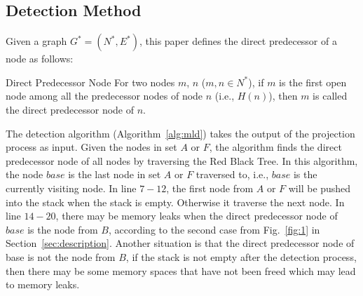 \subsection{Detection Method}

Given a graph $G^*=(N^*, E^*)$, this paper defines the direct predecessor of a node as follows:

\begin{definition}{Direct Predecessor Node}
For two nodes $m$, $n$ ($m, n\in N^*$), if $m$ is the first open node among all the predecessor nodes of node $n$ (i.e., $Η(n)$), then $m$ is called the direct predecessor node of $n$.
\end{definition}

The detection algorithm (Algorithm~\ref{alg:mld}) takes the output of the projection process as input. %
Given the nodes in set $A$ or $F$, the algorithm finds the direct predecessor node of all nodes by traversing the Red Black Tree. In this algorithm, the node $base$ is the last node in set $A$ or $F$ traversed to, i.e., $base$ is the currently visiting node. In line $7-12$, the first node from $A$ or $F$ will be pushed into the stack when the stack is empty. Otherwise it traverse the next node. In line $14-20$, there may be memory leaks when the direct predecessor node of $base$ is the node from $B$, according to the second case from Fig.~\ref{fig:1} in Section~\ref{sec:description}. Another situation is that the direct predecessor node of base is not the node from $B$, if the stack is not empty after the detection process, then there may be some memory spaces that have not been freed which may lead to memory leaks.

